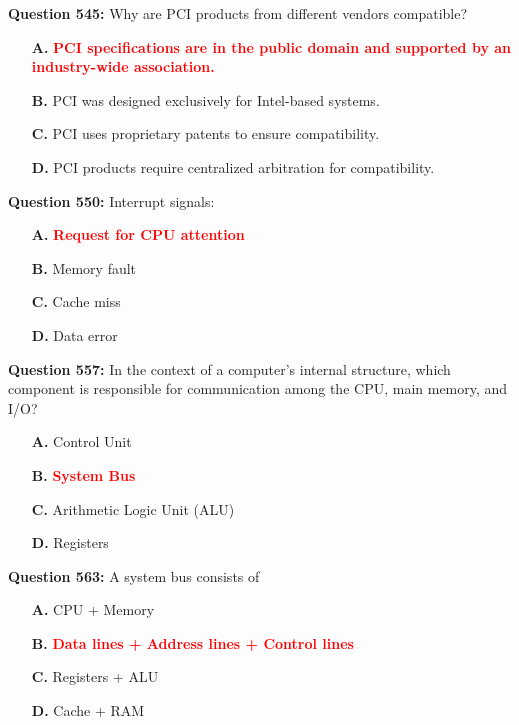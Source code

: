 \documentclass[12pt,a4paper]{article}
\begin{document}
\vspace{0.5cm}

\vspace{0.5cm}



\textbf{Question 545:} Why are PCI products from different vendors compatible?

\begin{itemize}
    \item[\textbf{A.}] \textcolor{red}{\textbf{PCI specifications are in the public domain and supported by an industry-wide association.}}
    \item[\textbf{B.}] PCI was designed exclusively for Intel-based systems.
    \item[\textbf{C.}] PCI uses proprietary patents to ensure compatibility.
    \item[\textbf{D.}] PCI products require centralized arbitration for compatibility.
\end{itemize}

\textbf{Question 550:} Interrupt signals:

\begin{itemize}
    \item[\textbf{A.}] \textcolor{red}{\textbf{Request for CPU attention}}
    \item[\textbf{B.}] Memory fault
    \item[\textbf{C.}] Cache miss
    \item[\textbf{D.}] Data error
\end{itemize}

\textbf{Question 557:} In the context of a computer's internal structure, which component is responsible for communication among the CPU, main memory, and I/O?

\begin{itemize}
    \item[\textbf{A.}] Control Unit
    \item[\textbf{B.}] \textcolor{red}{\textbf{System Bus}}
    \item[\textbf{C.}] Arithmetic Logic Unit (ALU)
    \item[\textbf{D.}] Registers
\end{itemize}

\textbf{Question 563:} A system bus consists of

\begin{itemize}
    \item[\textbf{A.}] CPU + Memory
    \item[\textbf{B.}] \textcolor{red}{\textbf{Data lines + Address lines + Control lines}}
    \item[\textbf{C.}] Registers + ALU
    \item[\textbf{D.}] Cache + RAM
\end{itemize}
\end{document}

